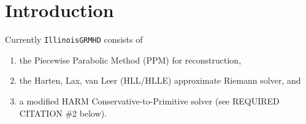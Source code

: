 \documentclass{article}
\begin{document}
\begin{abstract}
WARNING: This thorn has moved. Please use the version in
https://github.com/GRHayL/GRHayLET.git instead.

{\tt IllinoisGRMHD} solves the equations of General Relativistic 
MagnetoHydroDynamics (GRMHD) using a high-resolution shock capturing scheme.
It is a rewrite of the Illinois Numerical Relativity (ILNR) group's GRMHD 
code, and generates results that agree to roundoff error with that original
code. Its feature set coincides with the features of the ILNR group's 
recent code (ca. 2009--2014), which was used in their modeling of the
following systems:
\begin{enumerate}
\item Magnetized circumbinary disk accretion onto binary black holes
\item Magnetized black hole--neutron star mergers
\item Magnetized Bondi flow, Bondi-Hoyle-Littleton accretion
\item White dwarf--neutron star mergers
\end{enumerate}

{\tt IllinoisGRMHD} is particularly good at modeling GRMHD flows into black holes
without the need for excision. Its HARM-based conservative-to-primitive solver 
has also been modified to check the physicality of conservative variables 
prior to primitive inversion, and move them into the physical range if they 
become unphysical.

\end{abstract}


\section{Introduction}
\label{sec:intro}

Currently {\tt IllinoisGRMHD} consists of
\begin{enumerate}
\item the Piecewise Parabolic Method (PPM) for reconstruction, 
\item the Harten, Lax, van Leer (HLL/HLLE) approximate Riemann solver, and
\item a modified HARM Conservative-to-Primitive solver (see REQUIRED
  CITATION \#2 below).
\end{enumerate}
\end{document}
